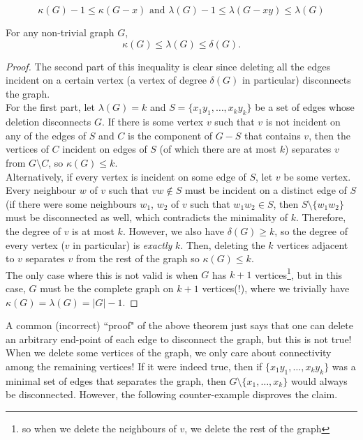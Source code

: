\[\kappa(G)-1 \leq \kappa(G-x) \text{ and } \lambda(G)-1 \leq \lambda(G-xy)\leq \lambda(G) \]

\begin{theorem}
For any non-trivial graph $G$, \[\kappa(G)\leq \lambda(G)\leq \delta(G).\]
\end{theorem}
\begin{proof}
The second part of this inequality is clear since deleting all the edges incident on a certain vertex (a vertex of degree $\delta(G)$ in particular) disconnects the graph.\\

For the first part, let $\lambda(G)=k$ and $S = \{x_1y_1,\ldots,x_k y_k\}$ be a set of edges whose deletion disconnects $G$.  If there is some vertex $v$ such that $v$ is not incident on any of the edges of $S$ and $C$ is the component of $G - S$ that contains $v$, then the vertices of $C$ incident on edges of $S$ (of which there are at most $k$) separates $v$ from $G\setminus C$, so $\kappa(G)\leq k$.\\[0.1cm]
Alternatively, if every vertex is incident on some edge of $S$, let $v$ be some vertex. Every neighbour $w$ of $v$ such that $v w\not\in S$ must be incident on a distinct edge of $S$ (if there were some neighbours $w_1$, $w_2$ of $v$ such that $w_1 w_2\in S$, then $S\setminus\{w_1 w_2\}$ must be disconnected as well, which contradicts the minimality of $k$. Therefore, the degree of $v$ is at most $k$. However, we also have $\delta(G)\geq k$, so the degree of every vertex ($v$ in particular) is \textit{exactly} $k$. Then, deleting the $k$ vertices adjacent to $v$ separates $v$ from the rest of the graph so $\kappa(G)\leq k$.\\
The only case where this is not valid is when $G$ has $k+1$ vertices\footnote{so when we delete the neighbours of $v$, we delete the rest of the graph}, but in this case, $G$ must be the complete graph on $k+1$ vertices(!), where we trivially have $\kappa(G)=\lambda(G)=|G|-1$.
\end{proof}

A common (incorrect) ``proof" of the above theorem just says that one can delete an arbitrary end-point of each edge to disconnect the graph, but this is not true! When we delete some vertices of the graph, we only care about connectivity among the remaining vertices! If it were indeed true, then if $\{x_1y_1,\ldots,x_k y_k\}$ was a minimal set of edges that separates the graph, then $G\setminus\{x_1,\ldots,x_k\}$ would always be disconnected. However, the following counter-example disproves the claim.

